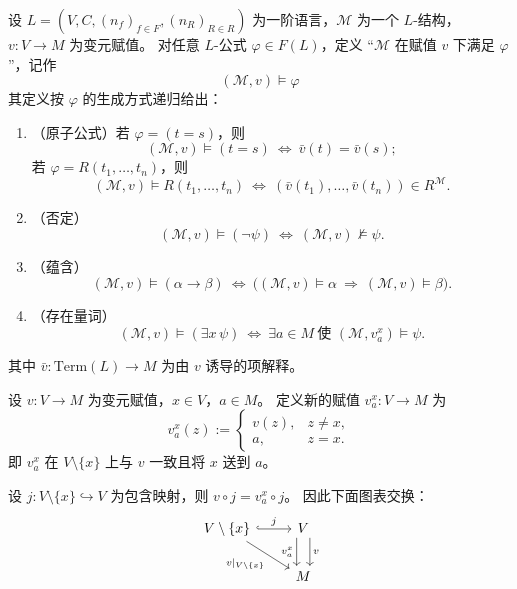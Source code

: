 \documentclass[lang=cn,a4paper,newtx,section]{elegantbook}
\begin{document}
 \begin{definition}[满足关系]
 设 $L=(V,C,(n_f)_{f\in F},(n_R)_{R\in R})$ 为一阶语言，$\mathcal M$ 为一个 $L$-结构，$v:V\to M$ 为变元赋值。
 对任意 $L$-公式 $\varphi\in F(L)$，定义 ``$\mathcal M$ 在赋值 $v$ 下满足 $\varphi$''，记作
 \[
   (\mathcal M,v)\models\varphi
 \]
 其定义按 $\varphi$ 的生成方式递归给出：
 \begin{enumerate}
   \item （原子公式）若 $\varphi=(t=s)$，则
   \[
     (\mathcal M,v)\models(t=s)\ \Longleftrightarrow\ \bar v(t)=\bar v(s);
   \]
   若 $\varphi=R(t_1,\dots,t_n)$，则
   \[
     (\mathcal M,v)\models R(t_1,\dots,t_n)\ \Longleftrightarrow\ (\bar v(t_1),\dots,\bar v(t_n))\in R^{\mathcal M}.
   \]
   \item （否定）
   \[
     (\mathcal M,v)\models(\neg\psi)\ \Longleftrightarrow\ (\mathcal M,v)\not\models\psi.
   \]
   \item （蕴含）
   \[
     (\mathcal M,v)\models(\alpha\to\beta)\ \Longleftrightarrow\ \bigl((\mathcal M,v)\models\alpha\ \Rightarrow\ (\mathcal M,v)\models\beta\bigr).
   \]
   \item （存在量词）
   \[
     (\mathcal M,v)\models(\exists x\,\psi)\ \Longleftrightarrow\ \exists a\in M\ \text{使 }(\mathcal M,v^{x}_{a})\models\psi.
   \]
 \end{enumerate}
 其中 $\bar v:\mathrm{Term}(L)\to M$ 为由 $v$ 诱导的项解释。
 \end{definition}

 \begin{definition}[替换赋值]
 设 $v:V\to M$ 为变元赋值，$x\in V$，$a\in M$。
 定义新的赋值 $v_a^{x}:V\to M$ 为
 \[
   v_a^{x}(z):=
   \begin{cases}
     v(z), & z\neq x,\\
     a, & z=x.
   \end{cases}
 \]
 即 $v_a^{x}$ 在 $V\setminus\{x\}$ 上与 $v$ 一致且将 $x$ 送到 $a$。
 \end{definition}

 \begin{remark}
 设 $j:V\setminus\{x\}\hookrightarrow V$ 为包含映射，则 $v\circ j=v_a^{x}\circ j$。
 因此下面图表交换：
 \[
 \begin{tikzcd}
 V\setminus\{x\} \arrow[r, hook, "j"] \arrow[dr, "v\vert_{V\setminus\{x\}}"'] & V \arrow[d, shift left=1.1ex, "v"] \arrow[d, shift right=1.1ex, "v_a^{x}"'] \\
 & M
 \end{tikzcd}
 \]
 \end{remark}
\end{document}
